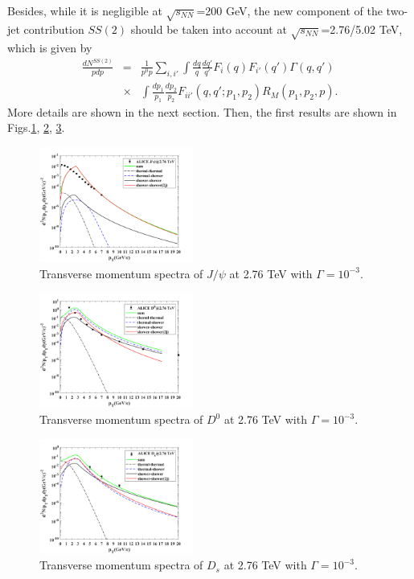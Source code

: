 \documentclass[twocolumn,aps,superscriptaddress,nofootinbib,floatfix]{revtex4}
\begin{document}
	Besides, while it is negligible at $\sqrt{s_{NN}}$=200 GeV, the new component of the two-jet contribution $SS(2)$ should be taken into account at $\sqrt{s_{NN}}$=2.76/5.02 TeV, which is given by \cite{Peng:2011zzd}
	\begin{eqnarray}
		\frac{dN^{SS(2)}}{pdp}&=&\frac{1}{p^0p}\sum_{i,i'} \int \frac{dq}{q}\frac{dq'}{q'}F_i(q)F_{i'}(q')\Gamma(q,q')   \\ 
		&\times& \int\frac{dp_1}{p_1}\frac{dp_2}{p_2}F_{ii'}(q,q';p_1,p_2)R_M(p_1,p_2,p).\nonumber
	\end{eqnarray}
	 More details are shown in the next section. Then, the first results are shown in Figs.\ref{fig4}, \ref{fig5}, \ref{fig6}.
	
	\begin{figure}[H]
		\includegraphics[width=0.45\textwidth]{Jpsi_276_1st.png}
		\caption{Transverse momentum spectra of $J/\psi$ at 2.76 TeV with $\Gamma=10^{-3}$.}
		\label{fig4}
	\end{figure}
	\begin{figure}[H]
		\includegraphics[width=0.45\textwidth]{D0_276_1st.png}
		\caption{Transverse momentum spectra of $D^0$ at 2.76 TeV with $\Gamma=10^{-3}$.}
		\label{fig5}
	\end{figure}
	\begin{figure}[H]
		\includegraphics[width=0.45\textwidth]{Ds_276_1st.png}
		\caption{Transverse momentum spectra of $D_s$ at 2.76 TeV with $\Gamma=10^{-3}$.}
		\label{fig6}
	\end{figure}
	
\end{document}
